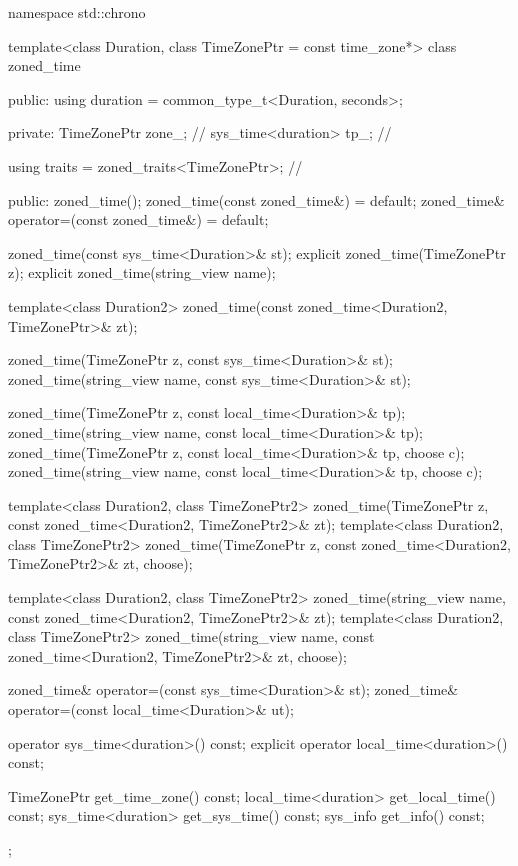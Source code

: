 \begin{codeblock}
namespace std::chrono {
  template<class Duration, class TimeZonePtr = const time_zone*>
  class zoned_time {
  public:
    using duration = common_type_t<Duration, seconds>;

  private:
    TimeZonePtr        zone_;                   // \expos
    sys_time<duration> tp_;                     // \expos

    using traits = zoned_traits<TimeZonePtr>;   // \expos

  public:
    zoned_time();
    zoned_time(const zoned_time&) = default;
    zoned_time& operator=(const zoned_time&) = default;

    zoned_time(const sys_time<Duration>& st);
    explicit zoned_time(TimeZonePtr z);
    explicit zoned_time(string_view name);

    template<class Duration2>
      zoned_time(const zoned_time<Duration2, TimeZonePtr>& zt);

    zoned_time(TimeZonePtr z,    const sys_time<Duration>& st);
    zoned_time(string_view name, const sys_time<Duration>& st);

    zoned_time(TimeZonePtr z,    const local_time<Duration>& tp);
    zoned_time(string_view name, const local_time<Duration>& tp);
    zoned_time(TimeZonePtr z,    const local_time<Duration>& tp, choose c);
    zoned_time(string_view name, const local_time<Duration>& tp, choose c);

    template<class Duration2, class TimeZonePtr2>
      zoned_time(TimeZonePtr z, const zoned_time<Duration2, TimeZonePtr2>& zt);
    template<class Duration2, class TimeZonePtr2>
      zoned_time(TimeZonePtr z, const zoned_time<Duration2, TimeZonePtr2>& zt, choose);

    template<class Duration2, class TimeZonePtr2>
      zoned_time(string_view name, const zoned_time<Duration2, TimeZonePtr2>& zt);
    template<class Duration2, class TimeZonePtr2>
      zoned_time(string_view name, const zoned_time<Duration2, TimeZonePtr2>& zt, choose);

    zoned_time& operator=(const sys_time<Duration>& st);
    zoned_time& operator=(const local_time<Duration>& ut);

    operator sys_time<duration>() const;
    explicit operator local_time<duration>() const;

    TimeZonePtr          get_time_zone()  const;
    local_time<duration> get_local_time() const;
    sys_time<duration>   get_sys_time()   const;
    sys_info             get_info()       const;
  };

}
\end{codeblock}
